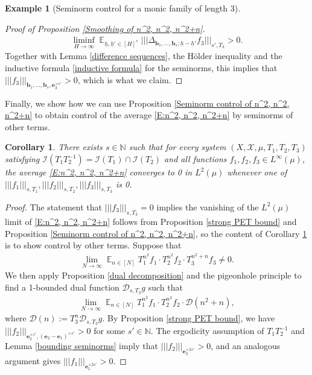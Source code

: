 \documentclass[11pt]{amsart}
\newtheorem{corollary}[lemma]{Corollary}
\theoremstyle{definition}
\newtheorem{example}{Example}
\newcommand{\N}{{\mathbb N}}
\newcommand{\CD}{{\mathcal D}}
\newcommand{\CI}{{\mathcal I}}
\newcommand{\CX}{{\mathcal X}}
\newcommand{\be}{{\mathbf{e}}}
\renewcommand{\b}{{\textbf{b}}}
\newcommand{\uh}{{\underline{h}}}
\newcommand{\nnorm}[1]{\lvert\!|\!| #1|\!|\!\rvert}
\DeclareMathOperator*{\E}{\mathbb{E}}
\begin{document}
\begin{example}[Seminorm control for a monic family of length 3]
\begin{proof}[Proof of Proposition \ref{Smoothing of n^2, n^2, n^2+n}]
\begin{align*}
    \liminf_{H \to\infty}\E_{\uh,\uh'\in [H]^{s}} \nnorm{\Delta_{{\b_1}, \ldots, {\b_{s}}; \uh-\uh'} f_3}_{s', T_3} >0.
\end{align*}
Together with Lemma \ref{difference sequences}, the H\"older inequality and the inductive formula \eqref{inductive formula} for the seminorms, this implies that $\nnorm{f_3}_{\b_1, \ldots, \b_s, \be_3^{\times s'}}>0$, which is what we claim.
\end{proof}

Finally, we show how we can use Proposition \ref{Seminorm control of n^2, n^2, n^2+n} to obtain control of the average \eqref{E:n^2, n^2, n^2+n} by seminorms of other terms.
\begin{corollary}\label{Seminorm control of n^2, n^2, n^2+n other terms}
    There exists $s\in\N$ such that for every system $(X, \CX, \mu, T_1, T_2, T_3)$ satisfying $\CI(T_1 T_2^{-1})=\CI(T_1)\cap\CI(T_2)$ and all  functions $f_1, f_2, f_3\in L^\infty(\mu)$, the average \eqref{E:n^2, n^2, n^2+n} converges to 0 in $L^2(\mu)$ whenever one of $\nnorm{f_1}_{s, T_1}, \nnorm{f_2}_{s, T_2}, \nnorm{f_3}_{s, T_3}$ is 0.
\end{corollary}
\begin{proof}
The statement that $\nnorm{f_3}_{s, T_3} = 0$ implies the vanishing of the $L^2(\mu)$ limit of \eqref{E:n^2, n^2, n^2+n} follows from Proposition \ref{strong PET bound} and Proposition \ref{Seminorm control of n^2, n^2, n^2+n}, so the content of Corollary \ref{Seminorm control of n^2, n^2, n^2+n other terms} is to show control by other terms. Suppose that
\begin{align*}
    \lim_{N\to\infty}     \E_{n\in[N]}T_1^{n^2} f_1 \cdot T_2^{n^2}f_2 \cdot T_3^{n^2+n}f_3  \neq 0.
\end{align*}
We then apply Proposition \ref{dual decomposition} and the pigeonhole principle to find a 1-bounded dual function $\CD_{s, T_3}g$ such that
\begin{align*}
    \lim_{N\to\infty}     \E_{n\in[N]}T_1^{n^2} f_1 \cdot T_2^{n^2}f_2 \cdot \CD(n^2+n),
\end{align*}
where $\CD(n) := T_3^n \CD_{s, T_3} g$. By Proposition \ref{strong PET bound}, we have $\nnorm{f_2}_{\be_2^{\times s'}, (\be_2-\be_1)^{\times s'}}>0$ for some $s'\in\N$. The ergodicity assumption of $T_1 T_2^{-1}$ and Lemma \ref{bounding seminorms} imply that $\nnorm{f_2}_{\be_2^{\times 2 s'}}>0$, and an analogous argument gives $\nnorm{f_1}_{\be_1^{\times 2 s'}}>0$.
\end{proof}
\end{example}
\end{document}

